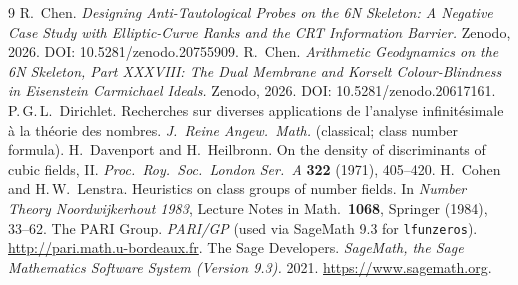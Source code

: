 \documentclass[11pt]{article}
\begin{document}
\begin{thebibliography}{9}
 R.\ Chen. \emph{Designing Anti-Tautological Probes on the 6N Skeleton: A Negative
Case Study with Elliptic-Curve Ranks and the CRT Information Barrier.} Zenodo, 2026.
DOI: 10.5281/zenodo.20755909.
 R.\ Chen. \emph{Arithmetic Geodynamics on the 6N Skeleton, Part XXXVIII: The Dual
Membrane and Korselt Colour-Blindness in Eisenstein Carmichael Ideals.} Zenodo, 2026.
DOI: 10.5281/zenodo.20617161.
 P.\,G.\,L.\ Dirichlet. Recherches sur diverses applications de l'analyse
infinit\'esimale \`a la th\'eorie des nombres. \emph{J.\ Reine Angew.\ Math.} (classical; class number
formula).
 H.\ Davenport and H.\ Heilbronn. On the density of discriminants of cubic fields, II.
\emph{Proc.\ Roy.\ Soc.\ London Ser.\ A} \textbf{322} (1971), 405--420.
 H.\ Cohen and H.\,W.\ Lenstra. Heuristics on class groups of number fields. In
\emph{Number Theory Noordwijkerhout 1983}, Lecture Notes in Math.\ \textbf{1068}, Springer (1984),
33--62.
 The PARI Group. \emph{PARI/GP} (used via SageMath 9.3 for \texttt{lfunzeros}).
\url{http://pari.math.u-bordeaux.fr}.
 The Sage Developers. \emph{SageMath, the Sage Mathematics Software System (Version 9.3).}
2021. \url{https://www.sagemath.org}.
\end{thebibliography}
\end{document}
